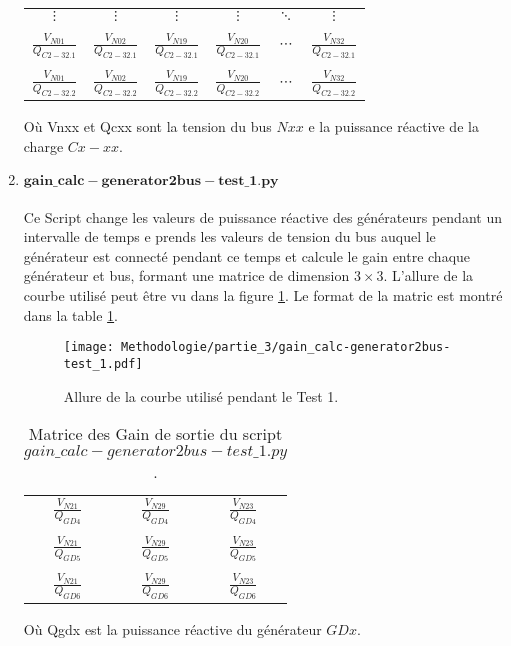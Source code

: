 \begin{enumerate}[\bfseries 5.1]
\begin{table}[H]
{\begin{tabular}{cccccc}
				$ \vdots $&$ \vdots $&$ \vdots $&$ \vdots $&$ \ddots $&$ \vdots $\\
				&&&&&\\
				$\frac{V_{N01}}{Q_{C 2-32.1}}$& $\frac{V_{N02}}{Q_{C 2-32.1}}$& $\frac{V_{N19}}{Q_{C 2-32.1}}$& $\frac{V_{N20}}{Q_{C 2-32.1}}$&$\cdots$&$\frac{V_{N32}}{Q_{C 2-32.1}}$\\
				&&&&&\\
				$\frac{V_{N01}}{Q_{C 2-32.2}}$& $\frac{V_{N02}}{Q_{C 2-32.2}}$& $\frac{V_{N19}}{Q_{C 2-32.2}}$& $\frac{V_{N20}}{Q_{C 2-32.2}}$&$\cdots$&$\frac{V_{N32}}{Q_{C 2-32.2}}$\\
		\end{tabular}}		
	\end{table}
	Où \gls{Vnxx}  et \gls{Qcxx} sont la tension du bus $ Nxx $ e la puissance réactive de la charge $ Cx-xx $.
	
	\item $\mathbf{gain\_calc-generator2bus-test\_1.py}$\\
	\\Ce Script change les valeurs de puissance réactive des générateurs pendant un intervalle de temps e prends les valeurs de tension du bus auquel le générateur est connecté pendant ce temps et calcule le gain entre chaque générateur et bus, formant une matrice de dimension $ 3\times3 $. L'allure de la courbe utilisé peut être vu dans la figure \ref{fig:gaincalcgenerator2bustest1}. Le format de la matric est montré dans la table \ref{tab:gaincalcgenerator2bustest1}.
	\begin{figure}[H]
		\begin{center}	
			\texttt{[image: Methodologie/partie\_3/gain\_calc-generator2bus-test\_1.pdf]}
			\caption{Allure de la courbe utilisé pendant le Test 1.}
			\label{fig:gaincalcgenerator2bustest1}
		\end{center}
	\end{figure}
\begin{table}[H]
	\captionsetup{justification=centering,margin=2cm}
	\caption{Matrice des Gain de sortie du script $gain\_calc-generator2bus-test\_1.py$.}
	\label{tab:gaincalcgenerator2bustest1}
	\centering
	\begin{tabular}{ccc}
		$ \frac{V_{N21}}{Q_{GD4}} $&$ \frac{V_{N29}}{Q_{GD4}} $&$ \frac{V_{N23}}{Q_{GD4}} $\\
		&&\\
		$ \frac{V_{N21}}{Q_{GD5}} $&$ \frac{V_{N29}}{Q_{GD5}} $&$ \frac{V_{N23}}{Q_{GD5}} $\\
		&&\\
		$ \frac{V_{N21}}{Q_{GD6}} $&$ \frac{V_{N29}}{Q_{GD6}} $&$ \frac{V_{N23}}{Q_{GD6}} $\\
	\end{tabular}
\end{table}
Où \gls{Qgdx} est la puissance réactive du générateur $ GDx $.


\end{enumerate}
